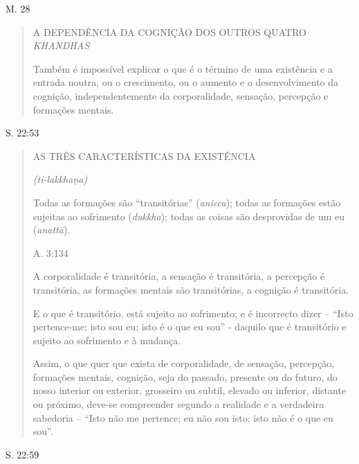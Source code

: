 M. 28

\begin{quote}
A DEPENDÊNCIA DA COGNIÇÃO DOS OUTROS QUATRO \emph{KHANDHAS}

Também é impossível explicar o que é o término de uma existência e a entrada noutra, ou o crescimento, ou o aumento e o desenvolvimento da cognição, independentemente da corporalidade, sensação, percepção e formações mentais.
\end{quote}

S. 22:53

\begin{quote}
AS TRÊS CARACTERÍSTICAS DA EXISTÊNCIA

\emph{(ti-lakkhaṇa)}

Todas as formações são ``transitórias'' (\emph{anicca}); todas as formações estão sujeitas ao sofrimento (\emph{dukkha}); todas as coisas são desprovidas de um eu (\emph{anattā}).

A. 3:134

A corporalidade é transitória, a sensação é transitória, a percepção é transitória, as formações mentais são transitórias, a cognição é transitória.

E o que é transitório, está sujeito ao sofrimento; e é incorrecto dizer -- ``Isto pertence-me; isto sou eu; isto é o que eu sou'' - daquilo que é transitório e sujeito ao sofrimento e à mudança.

Assim, o que quer que exista de corporalidade, de sensação, percepção, formações mentais, cognição, seja do passado, presente ou do futuro, do nosso interior ou exterior, grosseiro ou subtil, elevado ou inferior, distante ou próximo, deve-se compreender segundo a realidade e a verdadeira sabedoria -- ``Isto não me pertence; eu não sou isto; isto não é o que eu sou''.
\end{quote}

S. 22:59

